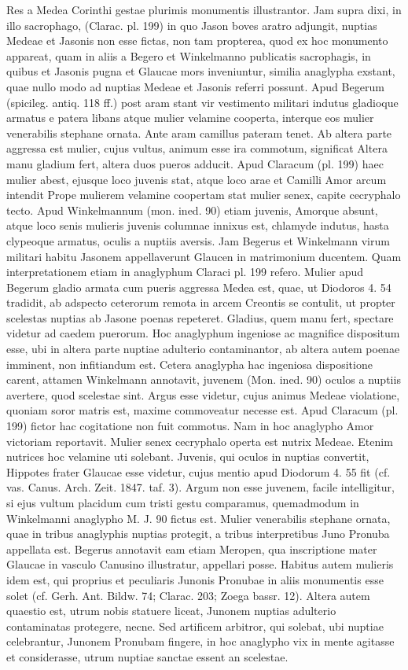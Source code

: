 \documentclass[a4paper, 11pt, oneside, polutonikogreek, german]{article}
\begin{document}
Res a Medea Corinthi gestae plurimis monumentis illustrantor. Jam supra dixi, in illo sacrophago, (Clarac. pl. 199) in quo Jason boves aratro adjungit, nuptias Medeae et Jasonis non esse fictas, non tam propterea, quod ex hoc monumento appareat, quam in aliis a Begero et Winkelmanno publicatis sacrophagis, in quibus et Jasonis pugna et Glaucae mors inveniuntur, similia anaglypha exstant, quae nullo modo ad nuptias Medeae et Jasonis referri possunt. Apud Begerum (spicileg. antiq. 118 ff.) post aram stant vir vestimento militari indutus gladioque armatus e patera libans atque mulier velamine cooperta, interque eos mulier venerabilis stephane ornata. Ante aram camillus pateram tenet. Ab altera parte aggressa est mulier, cujus vultus, animum esse ira commotum, significat Altera manu gladium fert, altera duos pueros adducit. Apud Claracum (pl. 199) haec mulier abest, ejusque loco juvenis stat, atque loco arae et Camilli Amor arcum intendit Prope mulierem velamine coopertam stat mulier senex, capite cecryphalo tecto. Apud Winkelmannum (mon. ined. 90) etiam juvenis, Amorque absunt, atque loco senis mulieris juvenis columnae innixus est, chlamyde indutus, hasta clypeoque armatus, oculis a nuptiis aversis. Jam Begerus et Winkelmann virum militari habitu Jasonem appellaverunt Glaucen in matrimonium ducentem. Quam interpretationem etiam in anaglyphum Claraci pl. 199 refero. Mulier apud Begerum gladio armata cum pueris aggressa Medea est, quae, ut Diodoros 4. 54 tradidit, ab adspecto ceterorum remota in arcem Creontis se contulit, ut propter scelestas nuptias ab Jasone poenas repeteret. Gladius, quem manu fert, spectare videtur ad caedem puerorum. Hoc anaglyphum ingeniose ac magnifice dispositum esse, ubi in altera parte nuptiae adulterio contaminantor, ab altera autem poenae imminent, non infitiandum est. Cetera anaglypha hac ingeniosa dispositione carent, attamen Winkelmann annotavit, juvenem (Mon. ined. 90) oculos a nuptiis avertere, quod scelestae sint. Argus esse videtur, cujus animus Medeae violatione, quoniam soror matris est, maxime commoveatur necesse est. Apud Claracum (pl. 199) fictor hac cogitatione non fuit commotus. Nam in hoc anaglypho Amor victoriam reportavit. Mulier senex cecryphalo operta est nutrix Medeae. Etenim nutrices hoc velamine uti solebant. Juvenis, qui oculos in nuptias convertit, Hippotes frater Glaucae esse videtur, cujus mentio apud Diodorum 4. 55 fit (cf. vas. Canus. Arch. Zeit. 1847. taf. 3). Argum non esse juvenem, facile intelligitur, si ejus vultum placidum cum tristi gestu comparamus, quemadmodum in Winkelmanni anaglypho M. J. 90 fictus est. Mulier venerabilis stephane ornata, quae in tribus anaglyphis nuptias protegit, a tribus interpretibus Juno Pronuba appellata est. Begerus annotavit eam etiam Meropen, qua inscriptione mater Glaucae in vasculo Canusino illustratur, appellari posse. Habitus autem mulieris idem est, qui proprius et peculiaris Junonis Pronubae in aliis monumentis esse solet (cf. Gerh. Ant. Bildw. 74; Clarac. 203; Zoega bassr. 12). Altera autem quaestio est, utrum nobis statuere liceat, Junonem nuptias adulterio contaminatas protegere, necne. Sed artificem arbitror, qui solebat, ubi nuptiae celebrantur, Junonem Pronubam fingere, in hoc anaglypho vix in mente agitasse et considerasse, utrum nuptiae sanctae essent an scelestae.
\end{document}
